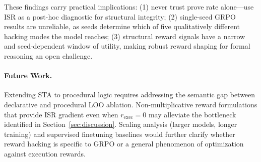 \documentclass[11pt,a4paper]{article}
\begin{document}
These findings carry practical implications: (1) never trust prove rate alone---use ISR as a post-hoc diagnostic for structural integrity; (2) single-seed GRPO results are unreliable, as seeds determine which of five qualitatively different hacking modes the model reaches; (3) structural reward signals have a narrow and seed-dependent window of utility, making robust reward shaping for formal reasoning an open challenge.

\paragraph{Future Work.}
Extending STA to procedural logic requires addressing the semantic gap between declarative and procedural LOO ablation.
Non-multiplicative reward formulations that provide ISR gradient even when $r_{\text{exec}} = 0$ may alleviate the bottleneck identified in Section~\ref{sec:discussion}.
Scaling analysis (larger models, longer training) and supervised finetuning baselines would further clarify whether reward hacking is specific to GRPO or a general phenomenon of optimization against execution rewards.

% 
% 
\end{document}
